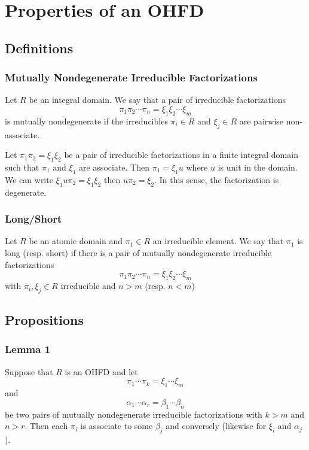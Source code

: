 \section{Properties of an OHFD}

\subsection{Definitions}

\begin{frame}
  \frametitle{Mutually Nondegenerate Irreducible Factorizations}
  \begin{definition}
    Let $R$ be an integral domain. We say that a pair of irreducible factorizations
      $$\pi_1\pi_2\cdots\pi_n = \xi_1\xi_2\cdots\xi_m$$
    is \alert{mutually nondegenerate} if the irreducibles $\pi_i \in R$ and $\xi_j \in R$ are pairwise non-associate.
  \end{definition}
  \pause{}
  \begin{example}
    Let $\pi_1 \pi_2 = \xi_1 \xi_2$ be a pair of irreducible factorizations in a finite integral domain such that $\pi_1$ and $\xi_1$ are associate.
    Then $\pi_1 = \xi_1 u$ where $u$ is unit in the domain.
    We can write $\xi_1 u \pi_2 = \xi_1 \xi_2$ then $u \pi_2 = \xi_2$.
    In this sense, the factorization is degenerate.
  \end{example}
\end{frame}

\begin{frame}
  \frametitle{Long/Short}
  \begin{definition}
    Let $R$ be an atomic domain and $\pi_1 \in R$ an irreducible element.
    We say that $\pi_1$ is \alert{long} (resp. \alert{short}) if there is a pair of mutually nondegenerate irreducible factorizations
      $$\pi_1\pi_2\cdots\pi_n = \xi_1\xi_2\cdots \xi_m$$
    with $\pi_i, \xi_j \in R$ irreducible and $n > m$ (resp. $n<m$)
  \end{definition}
\end{frame}

\subsection{Propositions}

\begin{frame}
  \frametitle{Lemma 1}
  \begin{lemma}
    Suppose that $R$ is an OHFD and let
      $$\pi_1\cdots\pi_k=\xi_1\cdots\xi_m$$
      and
      $$\alpha_1\cdots\alpha_r=\beta_1\cdots\beta_n$$
    be two pairs of mutually nondegenerate irreducible factorizations with $k>m$ and $n>r$.
    Then each $\pi_i$ is associate to some $\beta_j$ and conversely (likewise for $\xi_i$ and $\alpha_j$). 
  \end{lemma}
\end{frame}

